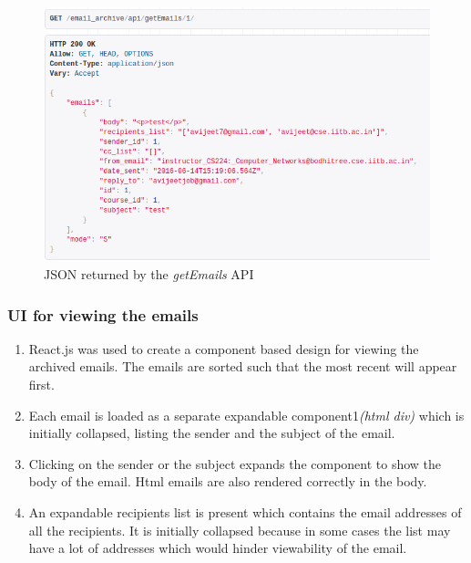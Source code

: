 \begin{figure}[h]
\centering
\includegraphics[width=0.95\linewidth]{./media/get_emails}
\caption{JSON returned by the \textit{getEmails} API}
\label{fig:get_emails}
\end{figure}

\subsubsection*{UI for viewing the emails}

\begin{enumerate}
	\item React.js was used to create a component based design for viewing the archived emails. The emails are sorted such that the most recent will appear first.
	\item Each email is loaded as a separate expandable component1\textit{(html div)} which is initially collapsed, listing the sender and the subject of the email.
	\item Clicking on the sender or the subject expands the component to show the body of the email. Html emails are also rendered correctly in the body.
	\item An expandable recipients list is present which contains the email addresses of all the recipients. It is initially collapsed because in some cases the list may have a lot of addresses which would hinder viewability of the email.
\end{enumerate}

